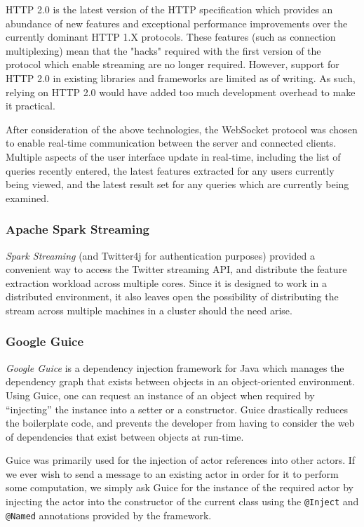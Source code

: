 \documentclass{l4proj}
\newcommand{\code}[1]{\texttt{#1}}
\begin{document}
        HTTP 2.0 is the latest version of the HTTP specification which provides an abundance of new features and exceptional performance improvements over the currently dominant HTTP 1.X protocols. These features (such as connection multiplexing) mean that the "hacks" required with the first version of the protocol which enable streaming are no longer required. However, support for HTTP 2.0 in existing libraries and frameworks are limited as of writing. As such, relying on HTTP 2.0 would have added too much development overhead to make it practical.
        
       After consideration of the above technologies, the WebSocket protocol was chosen to enable real-time communication between the server and connected clients. Multiple aspects of the user interface update in real-time, including the list of queries recently entered, the latest features extracted for any users currently being viewed, and the latest result set for any queries which are currently being examined.

        \subsubsection{Apache Spark Streaming}
        \textit{Spark Streaming} (and Twitter4j for authentication purposes) provided a convenient way to access the Twitter streaming API, and distribute the feature extraction workload across multiple cores. Since it is designed to work in a distributed environment, it also leaves open the possibility of distributing the stream across multiple machines in a cluster should the need arise.

        
        \subsubsection{Google Guice}
        \textit{Google Guice} is a dependency injection framework for Java which manages the dependency graph that exists between objects in an object-oriented environment. Using Guice, one can request an instance of an object when required by “injecting” the instance into a setter or a constructor. Guice drastically reduces the boilerplate code, and prevents the developer from having to consider the web of dependencies that exist between objects at run-time.

Guice was primarily used for the injection of actor references into other actors. If we ever wish to send a message to an existing actor in order for it to perform some computation, we simply ask Guice for the instance of the required actor by injecting the actor into the constructor of the current class using the \code{@Inject} and \code{@Named} annotations provided by the framework.
\end{document}
